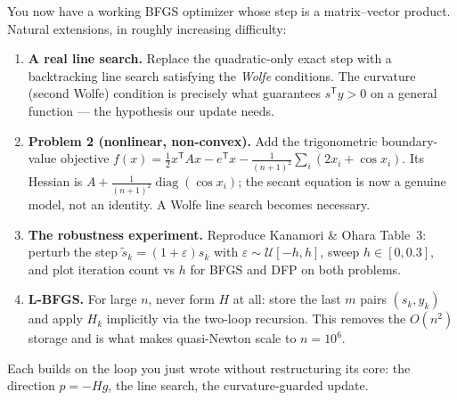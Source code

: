 \documentclass[11pt,letterpaper]{article}
\newcommand{\T}{^{\mathsf{T}}}
\newcommand{\half}{\tfrac12}
\begin{document}
You now have a working BFGS optimizer whose step is a matrix--vector product. Natural
extensions, in roughly increasing difficulty:

\begin{enumerate}
  \item \textbf{A real line search.} Replace the quadratic-only exact step with a
    backtracking line search satisfying the \emph{Wolfe} conditions. The curvature
    (second Wolfe) condition is precisely what guarantees $s\T y>0$ on a general
    function --- the hypothesis our update needs.
  \item \textbf{Problem 2 (nonlinear, non-convex).} Add the trigonometric
    boundary-value objective $f(x)=\half x\T Ax-e\T x-\frac1{(n+1)^2}\sum_i(2x_i+\cos x_i)$.
    Its Hessian is $A+\frac1{(n+1)^2}\operatorname{diag}(\cos x_i)$; the secant
    equation is now a genuine model, not an identity. A Wolfe line search becomes
    necessary.
  \item \textbf{The robustness experiment.} Reproduce Kanamori \& Ohara Table~3:
    perturb the step $\tilde s_k=(1+\varepsilon)s_k$ with $\varepsilon\sim
    \mathcal U[-h,h]$, sweep $h\in[0,0.3]$, and plot iteration count vs $h$ for BFGS
    and DFP on both problems.
  \item \textbf{L-BFGS.} For large $n$, never form $H$ at all: store the last $m$
    pairs $(s_k,y_k)$ and apply $H_k$ implicitly via the two-loop recursion. This
    removes the $O(n^2)$ storage and is what makes quasi-Newton scale to
    $n=10^6$.
\end{enumerate}

Each builds on the loop you just wrote without restructuring its core: the direction
$p=-Hg$, the line search, the curvature-guarded update.
\end{document}
